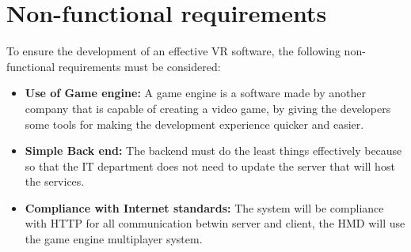 \section{Non-functional requirements}
\noindent
To ensure the development of an effective \ac{VR} software, the following non-functional requirements must be considered:

\begin{itemize}
  \item \textbf{Use of Game engine:} A game engine is a software made by another company that is capable of creating a video game, by giving the developers some tools for making the development experience quicker and easier.
  \item \textbf{Simple Back end:} The backend must do the least things effectively because so that the IT department does not need to update the server that will host the services.
  \item \textbf{Compliance with Internet standards:} The system will be compliance with \ac{HTTP} for all communication betwin server and client, the \ac{HMD} will use the game engine multiplayer system.
\end{itemize}

